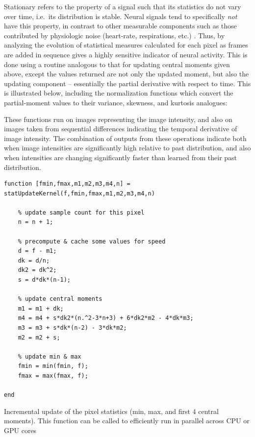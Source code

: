 Stationary refers to the property of a signal such that its statistics do not vary over time, i.e.~its distribution is stable.
Neural signals tend to specifically \emph{not} have this property, in contrast to other measurable components such as those contributed by physiologic noise (heart-rate, respirations, etc.)
.
Thus, by analyzing the evolution of statistical measures calculated for each pixel as frames are added in sequence gives a highly sensitive indicator of neural activity.
This is done using a routine analogous to that for updating central moments given above, except the values returned are not only the updated moment, but also the updating component -- essentially the partial derivative with respect to time.
This is illustrated below, including the normalization functions which convert the partial-moment values to their variance, skewness, and kurtosis analogues:


These functions run on images representing the image intensity, and also on images taken from sequential differences indicating the temporal derivative of image intensity.
The combination of outputs from these operations indicate both when image intensities are significantly high relative to past distribution, and also when intensities are changing significantly faster than learned from their past distribution.


\begin{listing}[ht]
\begin{verbatim}
function [fmin,fmax,m1,m2,m3,m4,n] = statUpdateKernel(f,fmin,fmax,m1,m2,m3,m4,n)

    % update sample count for this pixel
    n = n + 1;

    % precompute & cache some values for speed
    d = f - m1;
    dk = d/n;
    dk2 = dk^2;
    s = d*dk*(n-1);

    % update central moments
    m1 = m1 + dk;
    m4 = m4 + s*dk2*(n.^2-3*n+3) + 6*dk2*m2 - 4*dk*m3;
    m3 = m3 + s*dk*(n-2) - 3*dk*m2;
    m2 = m2 + s;

    % update min & max
    fmin = min(fmin, f);
    fmax = max(fmax, f);

end
\end{verbatim}
\caption[Incremental update of the pixel statistics (min, max, and first 4 central moments)]{Incremental update of the pixel statistics (min, max, and first 4 central moments). This function can be called to efficiently run in parallel across CPU or GPU cores}
\label{lst:update-statistic-gpu}
\end{listing}

